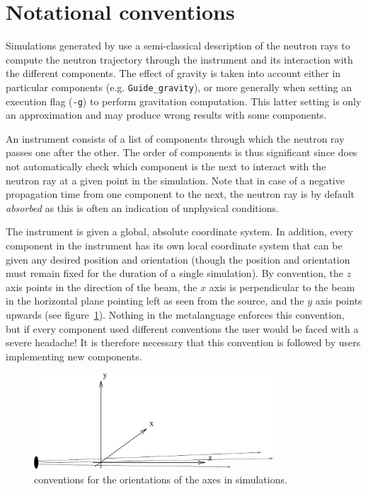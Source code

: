 \section{Notational conventions}

Simulations generated by \MCS use a semi-classical description of the neutron
rays to compute the neutron trajectory through the instrument and its
interaction with the different components. The effect of gravity is taken into
account either in particular components (e.g. \verb+Guide_gravity+), or more
generally when setting an execution flag (\verb+-g+) to perform gravitation
computation. This latter setting is only an approximation and may produce wrong
results with some components.

An instrument consists of a list of components through which the neutron
ray passes one after the other. The order of components is thus significant
since \mcs does not automatically check which component is the next to
interact with the neutron ray at a given point in the simulation. Note
that in case of a negative propagation time from one component to the
next, the neutron ray is by default \emph{absorbed} as this is often
an indication of unphysical conditions.

The instrument is given a global, absolute coordinate system. In
addition, every component in the instrument has its own local coordinate
system that can be given any desired position and orientation (though
the position and orientation must remain fixed for the duration of a
single simulation). 
By convention, the $z$ axis points in the direction of the beam, the $x$ axis
is perpendicular to the beam in the horizontal plane pointing left as seen
from the source, and the $y$ axis points upwards (see figure~\ref{f:axis}).
Nothing in the \MCS metalanguage enforces this convention, but if every component used
different conventions the user would be faced with a severe headache! It is
therefore necessary that this convention is followed by users implementing
new components.
\begin{figure}
  \begin{center}
    \includegraphics[width=0.8\textwidth]{figures/axis-conventions}
  \end{center}
\caption{conventions for the orientations of the axes in simulations.}
\label{f:axis}
\end{figure}

